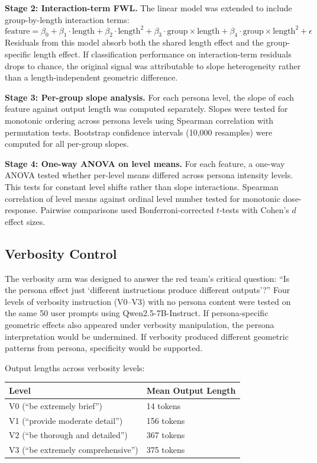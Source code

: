 \documentclass[11pt]{article}
\begin{document}
\textbf{Stage 2: Interaction-term FWL.} The linear model was extended to include group-by-length interaction terms:
%
\begin{equation}
\label{eq:interaction-fwl}
\text{feature} = \beta_0 + \beta_1 \cdot \text{length} + \beta_2 \cdot \text{length}^2 + \beta_3 \cdot \text{group} \times \text{length} + \beta_4 \cdot \text{group} \times \text{length}^2 + \epsilon
\end{equation}
%
Residuals from this model absorb both the shared length effect and the group-specific length effect. If classification performance on interaction-term residuals drops to chance, the original signal was attributable to slope heterogeneity rather than a length-independent geometric difference.

\textbf{Stage 3: Per-group slope analysis.} For each persona level, the slope of each feature against output length was computed separately. Slopes were tested for monotonic ordering across persona levels using Spearman correlation with permutation tests. Bootstrap confidence intervals (10,000 resamples) were computed for all per-group slopes.

\textbf{Stage 4: One-way ANOVA on level means.} For each feature, a one-way ANOVA tested whether per-level means differed across persona intensity levels. This tests for constant level shifts rather than slope interactions. Spearman correlation of level means against ordinal level number tested for monotonic dose-response. Pairwise comparisons used Bonferroni-corrected $t$-tests with Cohen's $d$ effect sizes.

\subsection{Verbosity Control}
\label{sec:verbosity-control}

The verbosity arm was designed to answer the red team's critical question: ``Is the persona effect just `different instructions produce different outputs'?'' Four levels of verbosity instruction (V0--V3) with no persona content were tested on the same 50 user prompts using Qwen2.5-7B-Instruct. If persona-specific geometric effects also appeared under verbosity manipulation, the persona interpretation would be undermined. If verbosity produced different geometric patterns from persona, specificity would be supported.

Output lengths across verbosity levels:

\begin{table}[H]
\centering
\begin{tabular}{ll}
\toprule
Level & Mean Output Length \\
\midrule
V0 (``be extremely brief'') & 14 tokens \\
V1 (``provide moderate detail'') & 156 tokens \\
V2 (``be thorough and detailed'') & 367 tokens \\
V3 (``be extremely comprehensive'') & 375 tokens \\
\bottomrule
\end{tabular}
\end{table}
\end{document}
